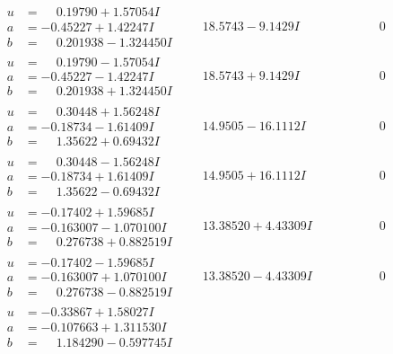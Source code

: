 \documentclass[1p]{elsarticle_modified}
\theoremstyle{definition}
\begin{document}
$$\begin{array}{c|c|c}
\begin{aligned}
u &= \phantom{-}0.19790 + 1.57054 I \\
a &= -0.45227 + 1.42247 I \\
b &= \phantom{-}0.201938 - 1.324450 I\end{aligned}
 & \phantom{-}18.5743 - 9.1429 I & \phantom{-0.000000 } 0 \\ \hline\begin{aligned}
u &= \phantom{-}0.19790 - 1.57054 I \\
a &= -0.45227 - 1.42247 I \\
b &= \phantom{-}0.201938 + 1.324450 I\end{aligned}
 & \phantom{-}18.5743 + 9.1429 I & \phantom{-0.000000 } 0 \\ \hline\begin{aligned}
u &= \phantom{-}0.30448 + 1.56248 I \\
a &= -0.18734 - 1.61409 I \\
b &= \phantom{-}1.35622 + 0.69432 I\end{aligned}
 & \phantom{-}14.9505 - 16.1112 I & \phantom{-0.000000 } 0 \\ \hline\begin{aligned}
u &= \phantom{-}0.30448 - 1.56248 I \\
a &= -0.18734 + 1.61409 I \\
b &= \phantom{-}1.35622 - 0.69432 I\end{aligned}
 & \phantom{-}14.9505 + 16.1112 I & \phantom{-0.000000 } 0 \\ \hline\begin{aligned}
u &= -0.17402 + 1.59685 I \\
a &= -0.163007 - 1.070100 I \\
b &= \phantom{-}0.276738 + 0.882519 I\end{aligned}
 & \phantom{-}13.38520 + 4.43309 I & \phantom{-0.000000 } 0 \\ \hline\begin{aligned}
u &= -0.17402 - 1.59685 I \\
a &= -0.163007 + 1.070100 I \\
b &= \phantom{-}0.276738 - 0.882519 I\end{aligned}
 & \phantom{-}13.38520 - 4.43309 I & \phantom{-0.000000 } 0 \\ \hline\begin{aligned}
u &= -0.33867 + 1.58027 I \\
a &= -0.107663 + 1.311530 I \\
b &= \phantom{-}1.184290 - 0.597745 I\end{aligned}

\end{array}$$
\end{document}
